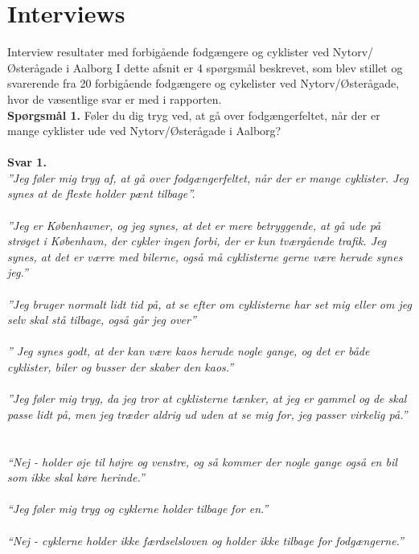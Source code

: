 \appendix
\label{appendix_start}
\chapter{Interviews}
  \label{chap:interviews}
Interview resultater med forbigående fodgængere og cyklister ved Nytorv/Østerågade i Aalborg I dette afsnit er 4 spørgsmål beskrevet, som blev stillet og svarerende fra 20 forbigående fodgængere og cykelister ved Nytorv/Østerågade, hvor de væsentlige svar er med i rapporten.
~\\
  \textbf{Spørgsmål 1.}
  Føler du dig tryg ved, at gå over fodgængerfeltet, når der er mange cyklister ude ved Nytorv/Østerågade i Aalborg?
~\\\\
  \textbf{Svar 1.} ~\\
 \emph{”Jeg føler mig tryg af, at gå over fodgængerfeltet, når der er mange cyklister. Jeg synes at de fleste holder pænt tilbage”.}
~\\\\
  \emph{”Jeg er Københavner, og jeg synes, at det er mere betryggende, at gå ude på strøget i København, der cykler ingen forbi, der er kun tværgående trafik. Jeg synes, at det er værre med bilerne, også må cyklisterne gerne være herude synes jeg.”}
~\\\\
  \emph{”Jeg bruger normalt lidt tid på, at se efter om cyklisterne har set mig eller om jeg selv skal stå tilbage, også går jeg over”}
~\\\\
\emph{” Jeg synes godt, at der kan være kaos herude nogle gange, og det er både cyklister, biler og busser der skaber den kaos.”}
~\\\\
  \emph{”Jeg føler mig tryg, da jeg tror at cyklisterne tænker, at jeg er gammel og de skal passe lidt på, men jeg træder aldrig ud uden at se mig for, jeg passer virkelig på.”}
~\\\\
  \emph{“Nej - holder øje til højre og venstre, og så kommer der nogle gange også en bil som ikke skal køre herinde.”}
~\\\\
  \emph{“Jeg føler mig tryg og cyklerne holder tilbage for en.”}
~\\\\
  \emph{“Nej - cyklerne holder ikke færdselsloven og holder ikke tilbage for fodgængerne.”}
~\\\\
